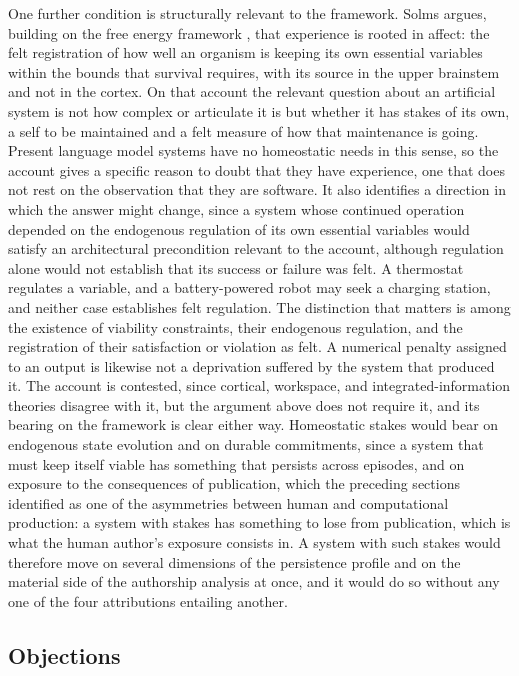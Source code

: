 \documentclass[12pt]{article}
\theoremstyle{definition}
\theoremstyle{plain}
\begin{document}
One further condition is structurally relevant to the framework. Solms \cite{solms2021} argues, building on the free energy framework \cite{friston2010}, that experience is rooted in affect: the felt registration of how well an organism is keeping its own essential variables within the bounds that survival requires, with its source in the upper brainstem and not in the cortex. On that account the relevant question about an artificial system is not how complex or articulate it is but whether it has stakes of its own, a self to be maintained and a felt measure of how that maintenance is going. Present language model systems have no homeostatic needs in this sense, so the account gives a specific reason to doubt that they have experience, one that does not rest on the observation that they are software. It also identifies a direction in which the answer might change, since a system whose continued operation depended on the endogenous regulation of its own essential variables would satisfy an architectural precondition relevant to the account, although regulation alone would not establish that its success or failure was felt. A thermostat regulates a variable, and a battery-powered robot may seek a charging station, and neither case establishes felt regulation. The distinction that matters is among the existence of viability constraints, their endogenous regulation, and the registration of their satisfaction or violation as felt. A numerical penalty assigned to an output is likewise not a deprivation suffered by the system that produced it. The account is contested, since cortical, workspace, and integrated-information theories disagree with it, but the argument above does not require it, and its bearing on the framework is clear either way. Homeostatic stakes would bear on endogenous state evolution and on durable commitments, since a system that must keep itself viable has something that persists across episodes, and on exposure to the consequences of publication, which the preceding sections identified as one of the asymmetries between human and computational production: a system with stakes has something to lose from publication, which is what the human author's exposure consists in. A system with such stakes would therefore move on several dimensions of the persistence profile and on the material side of the authorship analysis at once, and it would do so without any one of the four attributions entailing another.

\subsection{Objections}
\end{document}
